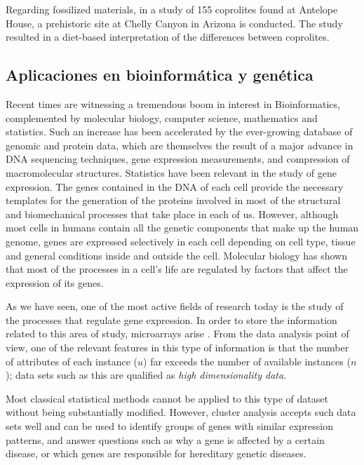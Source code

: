 Regarding fossilized materials, in \cite{sutton1995cluster} a study of 155 coprolites found at Antelope House, a prehistoric site at Chelly Canyon in Arizona is conducted. The study resulted in a diet-based interpretation of the differences between coprolites.

\subsection{Aplicaciones en bioinformática y genética}

Recent times are witnessing a tremendous boom in interest in Bioinformatics, complemented by molecular biology, computer science, mathematics and statistics. Such an increase has been accelerated by the ever-growing database of genomic and protein data, which are themselves the result of a major advance in DNA sequencing techniques, gene expression measurements, and compression of macromolecular structures. Statistics have been relevant in the study of gene expression. The genes contained in the DNA of each cell provide the necessary templates for the generation of the proteins involved in most of the structural and biomechanical processes that take place in each of us. However, although most cells in humans contain all the genetic components that make up the human genome, genes are expressed selectively in each cell depending on cell type, tissue and general conditions inside and outside the cell. Molecular biology has shown that most of the processes in a cell's life are regulated by factors that affect the expression of its genes.

As we have seen, one of the most active fields of research today is the study of the processes that regulate gene expression. In order to store the information related to this area of study, microarrays arise \cite{cortese2000array}. From the data analysis point of view, one of the relevant features in this type of information is that the number of attributes of each instance ($u$) far exceeds the number of available instances ($n$); data sets such as this are qualified as \textit{high dimensionality data}.

Most classical statistical methods cannot be applied to this type of dataset without being substantially modified. However, cluster analysis accepts such data sets well and can be used to identify groups of genes with similar expression patterns, and answer questions such as why a gene is affected by a certain disease, or which genes are responsible for hereditary genetic diseases.

